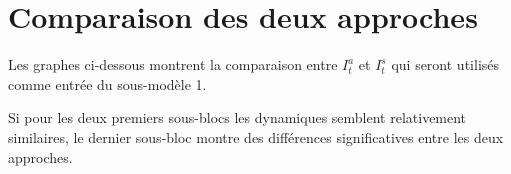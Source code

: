 \documentclass[a4paper, 11pt]{article}
\begin{document}
\begin{figure}[!h]
 \centering
\end{figure}

\clearpage


\section{Comparaison des deux approches}

Les graphes ci-dessous montrent la comparaison entre $I_t^a$ et $I_t^s$ qui seront utilisés comme entrée du sous-modèle 1.

\begin{figure}[h]
 \centering
\end{figure}
 
\begin{figure}[h]
 \centering
\end{figure}

\begin{figure}[ht]
 \centering
\end{figure}

\newpage

Si pour les deux premiers sous-blocs les dynamiques semblent relativement similaires, le dernier sous-bloc montre des différences significatives entre les deux approches.
\end{document}
